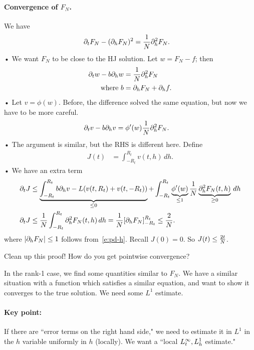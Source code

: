 \paragraph{Convergence of $F_N$.}
We have
\begin{align*}
\partial_t F_N - (\partial_h F_N)^2 &= \frac{1}{N} \partial_h^2 F_N.
\end{align*}•
We want $F_N$ to be close to the HJ solution. Let $w=F_N-f$; then
\begin{align*}
\partial_t w - b \partial_h w &= \frac{1}{N} \partial_h^2 F_N\\
\text{where } b&= \partial_h F_N + \partial_h f.
\end{align*}•
Let $v=\phi(w)$. 
Before, the difference solved the same equation, but now we have to be more careful. 
\begin{align*}
\partial_t v - b \partial_h v &= \phi'(w) \frac{1}{N}\partial_h^2F_N.
\end{align*}•
The argument is similar, but the RHS is different here. Define
\begin{align*}
J(t) &=\int_{-R_t}^{R_t} v(t,h)\,dh.
\end{align*}•
We have an extra term
\begin{align*}
\partial_t J &\le \underbrace{\int_{-R_t}^{R_t} b\partial_h v -L(v(t,R_t)+v(t,-R_t))}_{\le 0}+ \int_{-R_t}^{R_t}\underbrace{\phi'(w)}_{\le 1} \frac{1}{N} \underbrace{\partial_h^2 F_N(t,h)}_{\ge0}\,dh \\
\partial_t J &\le \frac{1}{N} \int_{-R_t}^{R_t} \partial_h^2 F_N(t,h) \,dh
=\frac{1}{N} [\partial_h F_N]_{-R_t}^{R_t} \le \frac{2}{N}.
\end{align*}
where $|\partial_h F_N|\le 1$ follows from~\eqref{e:pd-h}. 
Recall $J(0)=0$. So $J(t)\le \frac{2t}{N}$.
\begin{exr}
Clean up this proof! How do you get pointwise convergence?
\end{exr}

In the rank-1 case, we find some quantities similar to $F_N$. We have a similar situation with a function which satisfies a similar equation, and want to show it converges to the true solution. We need some $L^1$ estimate.

\paragraph{Key point:}
If there are ``error terms on the right hand side," we need to estimate it in $L^1$ in the $h$ variable uniformly in $h$ (locally). 
We want a ``local $L_t^\infty,L_h^1$ estimate." 

